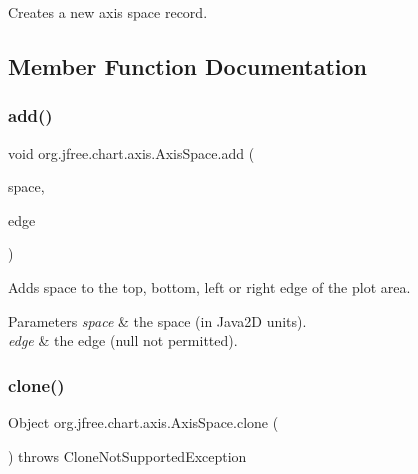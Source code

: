Creates a new axis space record. 

\subsection{Member Function Documentation}
\mbox{\label{classorg_1_1jfree_1_1chart_1_1axis_1_1_axis_space_ad9a1b609c7c1cb9552867ea361b748c8}} 
\subsubsection{\texorpdfstring{add()}{add()}}
{\footnotesize\ttfamily void org.\+jfree.\+chart.\+axis.\+Axis\+Space.\+add (\begin{DoxyParamCaption}\item[{double}]{space,  }\item[{Rectangle\+Edge}]{edge }\end{DoxyParamCaption})}

Adds space to the top, bottom, left or right edge of the plot area.


\begin{DoxyParams}{Parameters}
{\em space} & the space (in Java2D units). \\
\hline
{\em edge} & the edge ({\ttfamily null} not permitted). \\
\hline
\end{DoxyParams}
\mbox{\label{classorg_1_1jfree_1_1chart_1_1axis_1_1_axis_space_af8fbf29a9e04d17ead6506033cf292a3}} 
\subsubsection{\texorpdfstring{clone()}{clone()}}
{\footnotesize\ttfamily Object org.\+jfree.\+chart.\+axis.\+Axis\+Space.\+clone (\begin{DoxyParamCaption}{ }\end{DoxyParamCaption}) throws Clone\+Not\+Supported\+Exception}

